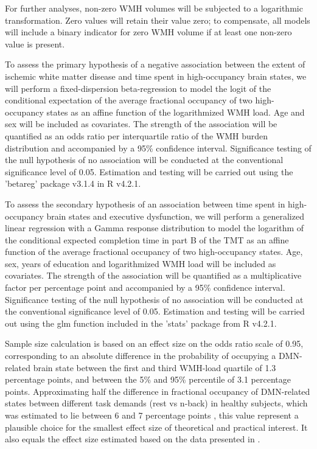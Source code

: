 For further analyses, non-zero WMH volumes will be subjected to a logarithmic transformation.
Zero values will retain their value zero; to compensate, all models will include a binary indicator for zero WMH volume if at least one non-zero value is present.

To assess the primary hypothesis of a negative association between the extent of ischemic white matter disease and time spent in high-occupancy brain states, we will perform a fixed-dispersion beta-regression to model the logit of the conditional expectation of the average fractional occupancy of two high-occupancy states as an affine function of the logarithmized WMH load.
Age and sex will be included as covariates.
The strength of the association will be quantified as an odds ratio per interquartile ratio of the WMH burden distribution and accompanied by a 95\% confidence interval.
Significance testing of the null hypothesis of no association will be conducted at the conventional significance level of 0.05.
Estimation and testing will be carried out using the 'betareg' package v3.1.4 in R v4.2.1.

To  assess the secondary hypothesis of an association between time spent in high-occupancy brain states and executive dysfunction, we will perform a generalized linear regression with a Gamma response distribution to model the logarithm of the conditional expected completion time in part B of the TMT as an affine function of the average fractional occupancy of two high-occupancy states.
Age, sex, years of education and logarithmized WMH load will be included as covariates.
The strength of the association will be quantified as a multiplicative factor per percentage point and accompanied by a 95\% confidence interval.
Significance testing of the null hypothesis of no association will be conducted at the conventional significance level of 0.05.
Estimation and testing will be carried out using the glm function included in the 'stats' package from R v4.2.1.

Sample size calculation is based on an effect size on the odds ratio scale of 0.95, corresponding to an absolute difference in the probability of occupying a DMN-related brain state between the first and third WMH-load quartile of 1.3 percentage points, and between the 5\% and 95\% percentile of 3.1 percentage points. Approximating half the difference in fractional occupancy of DMN-related states between different task demands (rest vs n-back) in healthy subjects, which was estimated to lie between 6 and 7 percentage points \citep{Cornblath2020-fu}, this value represent a plausible choice for the smallest effect size of theoretical and practical interest. It also equals the effect size estimated based on the data presented in \citep{Schlemm2022-he}. 

